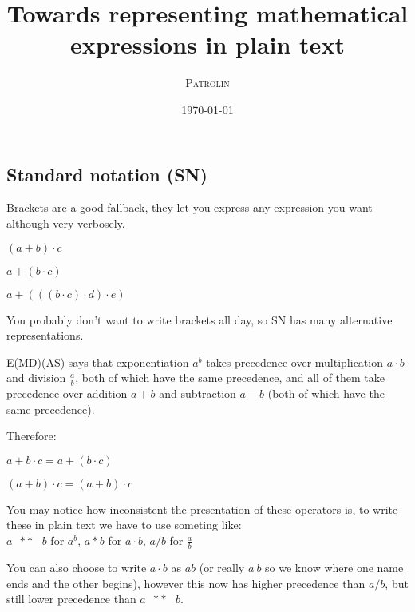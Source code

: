 \documentclass[twoside]{article}
\title{Towards representing mathematical expressions in plain text}
\author{\textsc{Patrolin}}
\date{\today}
\newcommand{\M}[1]{\scriptstyle{#1}} %
\newcommand{\T}[1]{\textrm{#1}} %
\newcommand{\F}[2]{\frac{#1}{#2}} %
\newcommand{\pow}{\T{ }\M{**}\T{ }}
\begin{document}
    \maketitle
    \thispagestyle{empty}

    \begin{multicols*}{2}
        \section{Standard notation (SN)}
            Brackets are a good fallback, they let you express any expression you want although very verbosely.\vspace{1px}\\
            \centerline{$ (a + b) \cdot c $}
            \centerline{$ a + (b \cdot c) $}
            \centerline{$ a + (((b \cdot c) \cdot d) \cdot e) $}
            \par\vspace{5px}
                You probably don't want to write brackets all day,
                so SN has many alternative representations.
                \par
                E(MD)(AS) says that exponentiation $a^b$ takes precedence
                over multiplication $a\cdot{}b$ and division $\F{a}{b}$, both of which have the same precedence,
                and all of them take precedence over addition $a+b$ and subtraction $a-b$ (both of which have the same precedence).
                \par
                Therefore:\vspace{2px}\\
                \centerline{$ a + b \cdot c = a + (b \cdot c) $}
                \centerline{$ (a + b) \cdot c = (a + b) \cdot c $}\vspace{-1px}
            \par\vspace{5px}
                You may notice how inconsistent the presentation of these operators is,
                to write these in plain text we have to use someting like:\\
                $a\pow{}b$ for $a^b$, $a*b$ for $a\cdot{}b$, $a/b$ for $\F{a}{b}$
                \par
                You can also choose to write $a\cdot{}b$ as $ab$
                (or really $a\ b$ so we know where one name ends and the other begins),
                however this now has higher precedence than $a/b$, but still lower precedence than $a\pow{}b$.
            \par\vspace{5px}

\end{multicols*}
\end{document}
